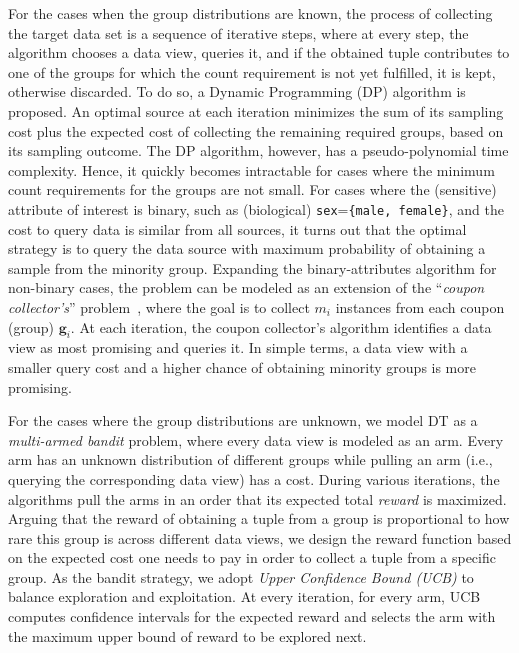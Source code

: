 \documentclass[11pt]{article}
\newcommand{\gee}{\mathbf{g}}
\begin{document}
For the cases when the group distributions are known, the process of collecting the target data set is a sequence of iterative steps, where at every step, the algorithm chooses a data view, queries it, and if the obtained tuple contributes to one of the groups for which the count requirement is not yet fulfilled, it is kept, otherwise discarded. To do so, a {Dynamic Programming (DP)} algorithm is proposed. An optimal source at each iteration minimizes the sum of its sampling cost plus the expected cost of collecting the remaining required groups, based on its sampling outcome.
The DP algorithm, however, has a pseudo-polynomial time complexity. Hence, it quickly becomes intractable for cases where the minimum count requirements for the groups are not small. 
For cases where the (sensitive) attribute of interest is binary, such as (biological) {\tt sex}={\tt \{male, female\}}, and the cost to query data is similar from all sources, it turns out that the optimal strategy is to query the data source with {maximum probability of obtaining a sample from the minority group}.
Expanding the binary-attributes algorithm for non-binary cases, the problem can be modeled as an extension of the ``{\it coupon collector's}'' problem~\cite{motwani1995randomized}, where the goal is to collect $m_i$ instances from each coupon (group) $\gee_i$.
At each iteration, the coupon collector's algorithm identifies a data view as most promising and queries it. In simple terms, a data view with a smaller query cost and a higher chance of obtaining minority groups is more promising.


For the cases where the group distributions are unknown, we model DT as a {\it multi-armed bandit} problem, where every data view is modeled as an arm. 
Every arm has an unknown distribution of different groups while pulling an arm (i.e., querying the corresponding data view) has a cost.
During various iterations, the algorithms pull the arms in an order that its expected total {\it reward} is maximized.
Arguing that the reward of obtaining a tuple from a group is proportional to how rare this group is across different data views, 
we design the reward function based on the expected cost one needs to pay in order to collect a tuple from a specific group.  
As the bandit strategy, we adopt {\it Upper Confidence Bound (UCB)} to balance exploration and exploitation. At every iteration, for every arm, UCB computes confidence intervals for the expected reward and selects the arm with the maximum upper bound of reward to be explored next.
\end{document}
